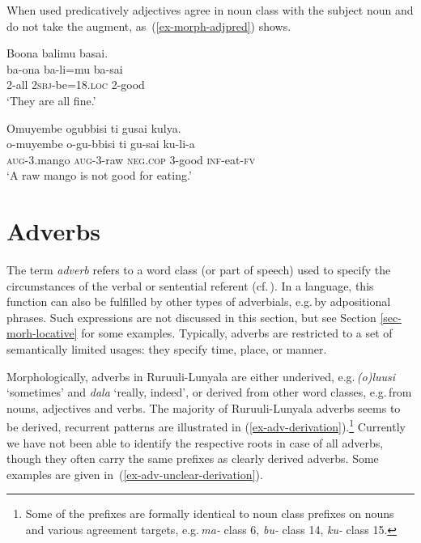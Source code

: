 When used predicatively adjectives agree in noun class with the subject noun and do not take the augment, as~(\ref{ex-morph-adjpred}) shows.

\ea \label{ex-morph-adjpred}
\begin{xlist}
\ex
	\gll  Boona	balimu		basai.\\
	    ba-ona	ba-li=mu		ba-sai\\
		2-all	\textsc{2sbj}-be=18.\textsc{loc}	 2-good\\
	\glt ‘They are all fine.’	
\ex 
	
	\gll	Omuyembe ogubbisi ti gusai kulya.\\
	o-muyembe o-gu-bbisi ti gu-sai ku-li-a\\
	\textsc{aug}-3.mango \textsc{aug}-3-raw \textsc{neg}.\textsc{cop} 3-good \textsc{inf}-eat-\textsc{fv}\\
	\glt ‘A raw mango is not good for eating.’

\end{xlist}
\z


\section{Adverbs}\label{sec-adverbs}

The term \textit{adverb} refers to a word class (or part of speech) used to specify the circumstances of the verbal or sentential referent (cf.\,\citealt{Maienbornetal2011Adverbs}). 
In a language, this function can also be  fulfilled by other types of adverbials, e.g.\,by adpositional phrases. 
Such expressions are not discussed in this section, but see Section \ref{sec-morh-locative} for some examples.  
Typically, adverbs are restricted to a set of semantically limited usages: they specify time, place, or manner. 

Morphologically, adverbs in Ru\-ruu\-li\hyp{}Lu\-nya\-la are either underived, e.g.\,\textit{(o)luusi} `sometimes' and \textit{dala} ‘really, indeed', or derived from other word classes, e.g.\,from nouns, adjectives and verbs. 
The majority of Ru\-ruu\-li\hyp{}Lu\-nya\-la adverbs seems to be derived, 
recurrent patterns are illustrated in (\ref{ex-adv-derivation}).\footnote{Some of the prefixes are formally identical to noun class prefixes on nouns and various agreement targets, e.g.\,\textit{ma-} class 6, \textit{bu-} class 14, \textit{ku-} class 15.}  
Currently we have not been able to identify the respective roots in case of all adverbs, though they often carry the same prefixes as clearly derived adverbs.
Some examples are given in~(\ref{ex-adv-unclear-derivation}).

